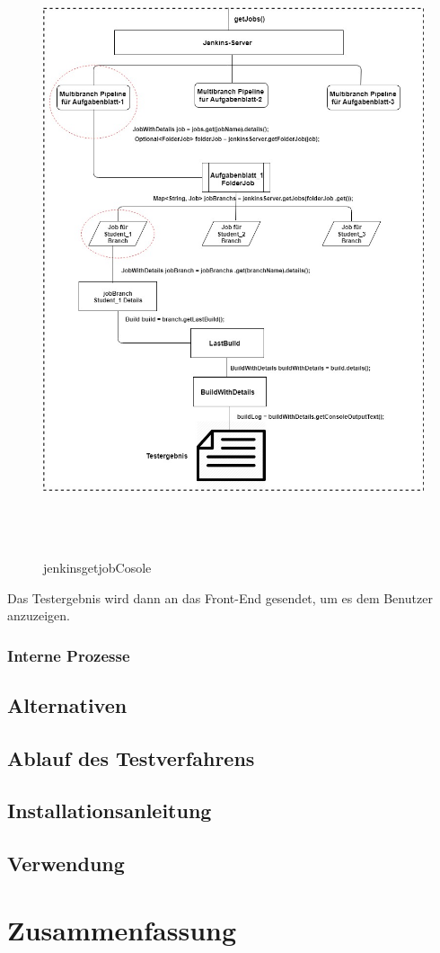 \documentclass[a4paper,12pt,oneside]{book}
\begin{document}
 \begin{figure}[h!]
 	\begin{center}
 		\includegraphics[width=15cm, height=18cm]{TestergebnisOutput.jpg}
 		\caption{jenkinsgetjobCosole} 
 		\label{jenkinsgetjobCosole} 
 	\end{center}
 \end{figure}
\newline
Das Testergebnis wird dann an das Front-End gesendet, um es dem Benutzer anzuzeigen.
\subsection{Interne Prozesse}
\section{Alternativen}
\section{Ablauf des Testverfahrens}
\section{Installationsanleitung}
\section{Verwendung}
\chapter{Zusammenfassung}
\begin{thebibliography}{9}
\end{thebibliography}
\end{document}
